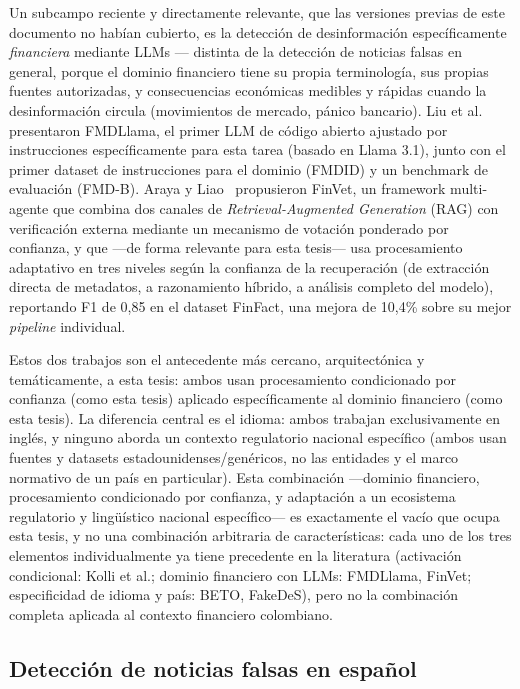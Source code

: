 Un subcampo reciente y directamente relevante, que las versiones previas de este documento no habían cubierto, es la detección de desinformación específicamente \emph{financiera} mediante LLMs — distinta de la detección de noticias falsas en general, porque el dominio financiero tiene su propia terminología, sus propias fuentes autorizadas, y consecuencias económicas medibles y rápidas cuando la desinformación circula (movimientos de mercado, pánico bancario). Liu et al.~\cite{Liu2024FMDLlama} presentaron FMDLlama, el primer LLM de código abierto ajustado por instrucciones específicamente para esta tarea (basado en Llama 3.1), junto con el primer dataset de instrucciones para el dominio (FMDID) y un benchmark de evaluación (FMD-B). Araya y Liao~\cite{Araya2025FinVet} propusieron FinVet, un framework multi-agente que combina dos canales de \textit{Retrieval-Augmented Generation} (RAG) con verificación externa mediante un mecanismo de votación ponderado por confianza, y que —de forma relevante para esta tesis— usa procesamiento adaptativo en tres niveles según la confianza de la recuperación (de extracción directa de metadatos, a razonamiento híbrido, a análisis completo del modelo), reportando F1 de 0,85 en el dataset FinFact, una mejora de 10,4\% sobre su mejor \textit{pipeline} individual.

Estos dos trabajos son el antecedente más cercano, arquitectónica y temáticamente, a esta tesis: ambos usan procesamiento condicionado por confianza (como esta tesis) aplicado específicamente al dominio financiero (como esta tesis). La diferencia central es el idioma: ambos trabajan exclusivamente en inglés, y ninguno aborda un contexto regulatorio nacional específico (ambos usan fuentes y datasets estadounidenses/genéricos, no las entidades y el marco normativo de un país en particular). Esta combinación —dominio financiero, procesamiento condicionado por confianza, y adaptación a un ecosistema regulatorio y lingüístico nacional específico— es exactamente el vacío que ocupa esta tesis, y no una combinación arbitraria de características: cada uno de los tres elementos individualmente ya tiene precedente en la literatura (activación condicional: Kolli et al.; dominio financiero con LLMs: FMDLlama, FinVet; especificidad de idioma y país: BETO, FakeDeS), pero no la combinación completa aplicada al contexto financiero colombiano.

\subsection{Detección de noticias falsas en español}

